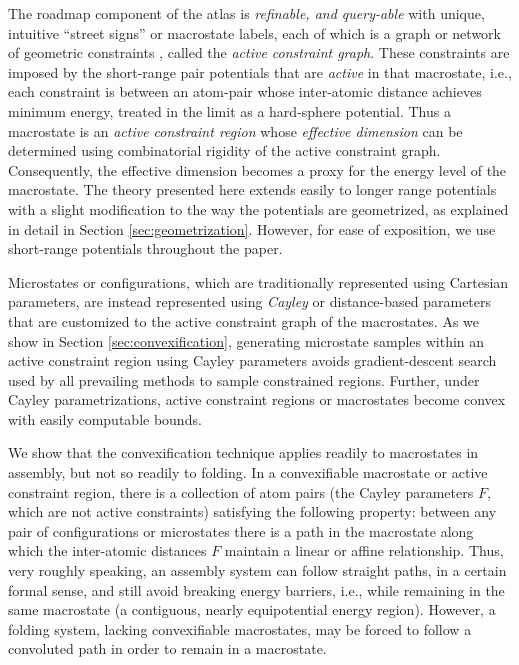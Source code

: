 \documentclass[]{article}
\begin{document}
The roadmap component of the atlas is \emph{refinable, and query-able} with
unique, intuitive ``street signs'' or macrostate labels, each of which is a
graph or network of geometric constraints \cite{SJS:Handbook}, called the
\emph{active constraint graph}. These constraints are imposed by the
short-range pair potentials that are \emph{active} in that macrostate, i.e.,
each constraint is between an atom-pair whose inter-atomic distance achieves
minimum energy, treated in the limit as a hard-sphere potential. Thus a
macrostate is an \emph{active constraint region} whose \emph{effective
dimension} can be determined using combinatorial rigidity \cite{SJS:Handbook}
of the active constraint graph. Consequently, the effective dimension becomes
a proxy for the energy level of the macrostate. The theory presented here
extends easily to longer range potentials with a slight modification to the way
the potentials are geometrized, as explained in detail in Section
\ref{sec:geometrization}. However, for ease of exposition, we use short-range
potentials throughout the paper.

Microstates or configurations, which are traditionally represented using
Cartesian parameters, are instead represented using \emph{Cayley} or
distance-based parameters that are customized to the active constraint graph of
the macrostates. As we show in Section \ref{sec:convexification}, generating
microstate samples within an active constraint region using Cayley parameters
avoids gradient-descent search used by all prevailing methods to sample
constrained regions. Further, under Cayley parametrizations, active constraint
regions or macrostates become convex with easily computable bounds. 

We show that the convexification technique applies readily to macrostates in
assembly, but not so readily to folding. In a convexifiable macrostate or
active constraint region, there is a collection of atom pairs (the Cayley
parameters $F$, which are not active constraints) satisfying the following
property: between any pair of configurations or microstates there is a path in
the macrostate along which the inter-atomic distances $F$ maintain a linear or
affine relationship. Thus, very roughly speaking, an assembly system can follow
straight paths, in a certain formal sense, and still avoid breaking energy
barriers, i.e., while remaining in the same macrostate (a contiguous, nearly
equipotential energy region). However, a folding system, lacking convexifiable
macrostates, may be forced to follow a convoluted path in order to remain in a
macrostate.
\end{document}
